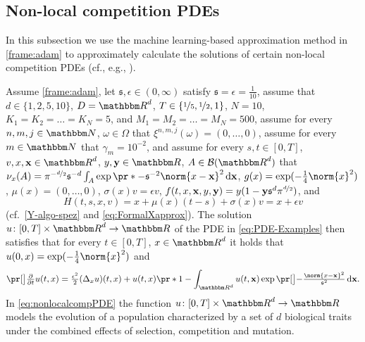 \subsection{Non-local competition PDEs}
\label{subsec:nonlocalcompPDE}
%
In this subsection we use the machine learning-based approximation method in \cref{frame:adam}
to approximately calculate the solutions of certain non-local competition PDEs (cf., e.g., \cite{Doebeli2010,Berestycki2009b,Perthame2007,Genieys2006a}).
%

Assume 
	\cref{frame:adam}, 
let
	$\mathfrak s,\epsilon\in(0,\infty)$
satisfy
	$\mathfrak{s} = \epsilon =\tfrac{1}{10}$,
assume that
	$d\in\{1,2,5,10\}$,
	$\D = \R^d$,
	$T\in\{\nicefrac{1}{5},\nicefrac{1}{2},1\}$,
	$N=10$,
	$K_1 = K_2 = \ldots = K_N= 5$, and
	$M_1 = M_2 = \ldots = M_N = 500$,
assume 
	for every 
		$n,m,j\in \N$, $\omega \in \Omega$ 
	that 
		$\xi^{n,m,j}(\omega)=(0,\dots,0)$,
assume
	for every 
		$m \in \N$
	that
		$\gamma_m = 10^{-2}$,
and assume 
	for every 
		$s,t \in [0,T]$, 
		$v,x,\mathbf{x}%
		\in \R^d$, 
		$y,\mathbf{y} \in \R$,
		$A \in \mathcal{B}(\R^d)$
	that
		$\nu_x(A) = \pi^{-\nicefrac{d}{2}}\mathfrak{s}^{-d}\int_A \exp\pr*{-\mathfrak{s}^{-2}\norm{x - \mathbf{x}}^2}\,\diff\mathbf{x}$,
		$g(x)= \exp (-\tfrac{1}{4}\norm{x}^2)$,
		$\mu(x)=(0,\dots,0)$,
		$\sigma(x) v=\epsilon v$, 
		$f(t,x,\mathbf{x},y,\mathbf{y}%
		)=  y(1 - \mathbf{y} \mathfrak{s}^d\pi^{\nicefrac{d}{2}})$, and
	\begin{equation}
		\label{eq:Hcomp}
		H(t,s,x,v)
		=
		x + \mu(x)(t-s)+ \sigma(x)v
		=
		x+\epsilon v
	\end{equation}
	(cf.\ \eqref{Y-algo-spez} and \eqref{eq:FormalXapprox}).
The solution 
	$u\colon[0,T]\times \R^d \to \R$ 
	of the PDE in \eqref{eq:PDE-Examples} then satisfies that 
		for every
			$t\in [0,T]$, $x\in\R^d$ 
		it holds that 
			$u(0,x)=\exp (-\tfrac{1}{4}\norm{x}^2)$ and
		\begin{equation}
			\label{eq:nonlocalcompPDE}
 			\bpr{\tfrac{\partial}{\partial t}u}(t,x)
 			=
 			\tfrac{\epsilon^2}{2}(\Delta_x u)(t,x) + u(t,x) \pr*{1 - \int_{\R^d} u(t,\mathbf{x}) \exp \bpr{-\tfrac{\norm{x-\mathbf{x}}^2}{\mathfrak{s}^2} } \, \diff \mathbf{x} }
			.
		\end{equation}
%
%
In \eqref{eq:nonlocalcompPDE} the function $u\colon[0,T]\times\R^d\to\R$ models the evolution of a population characterized by a set of $d$ biological traits under the combined effects of selection, competition and mutation. 
